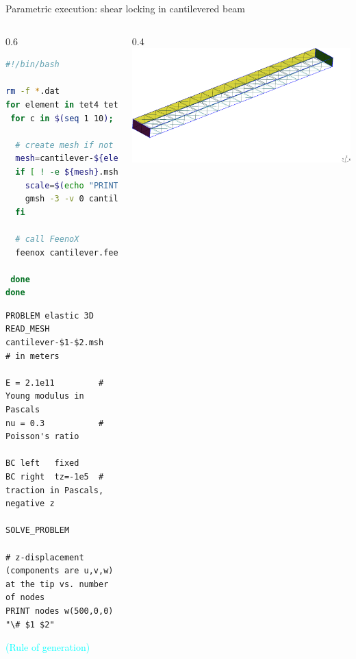 \documentclass[
  ignorenonframetext,
  aspectratio=169,
]{beamer}
\begin{document}
\begin{frame}[fragile]{Parametric execution: shear locking in
cantilevered beam}
\protect\hypertarget{parametric-execution-shear-locking-in-cantilevered-beam}{}
\begin{columns}[T]
\begin{column}{0.6\textwidth}
\begin{lstlisting}[language=bash, style=bash]
#!/bin/bash

rm -f *.dat
for element in tet4 tet10 hex8 hex20 hex27; do
 for c in $(seq 1 10); do
 
  # create mesh if not alreay cached
  mesh=cantilever-${element}-${c}
  if [ ! -e ${mesh}.msh ]; then
    scale=$(echo "PRINT 1/${c}" | feenox -)
    gmsh -3 -v 0 cantilever-${element}.geo -clscale ${scale} -o ${mesh}.msh
  fi
  
  # call FeenoX
  feenox cantilever.fee ${element} ${c} | tee -a cantilever-${element}.dat
  
 done
done
\end{lstlisting}

\begin{lstlisting}[style=feenox]
PROBLEM elastic 3D
READ_MESH cantilever-$1-$2.msh   # in meters

E = 2.1e11         # Young modulus in Pascals
nu = 0.3           # Poisson's ratio

BC left   fixed
BC right  tz=-1e5  # traction in Pascals, negative z
 
SOLVE_PROBLEM

# z-displacement (components are u,v,w) at the tip vs. number of nodes
PRINT nodes w(500,0,0) "\# $1 $2"
\end{lstlisting}

\vspace{-0.25cm}\hfill{\footnotesize\textcolor{cyan}{(Rule of {generation})}}
\end{column}

\begin{column}{0.4\textwidth}
\includegraphics{cantilever-tet.png}


\end{column}
\end{columns}
\end{frame}
\end{document}

